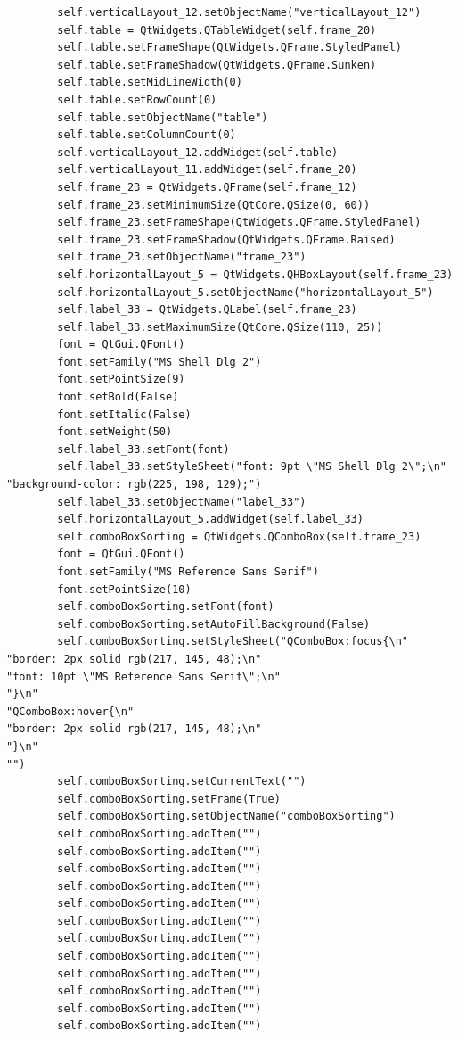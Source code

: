 \documentclass[12pt]{article}
\begin{document}
\begin{verbatim}
        self.verticalLayout_12.setObjectName("verticalLayout_12")
        self.table = QtWidgets.QTableWidget(self.frame_20)
        self.table.setFrameShape(QtWidgets.QFrame.StyledPanel)
        self.table.setFrameShadow(QtWidgets.QFrame.Sunken)
        self.table.setMidLineWidth(0)
        self.table.setRowCount(0)
        self.table.setObjectName("table")
        self.table.setColumnCount(0)
        self.verticalLayout_12.addWidget(self.table)
        self.verticalLayout_11.addWidget(self.frame_20)
        self.frame_23 = QtWidgets.QFrame(self.frame_12)
        self.frame_23.setMinimumSize(QtCore.QSize(0, 60))
        self.frame_23.setFrameShape(QtWidgets.QFrame.StyledPanel)
        self.frame_23.setFrameShadow(QtWidgets.QFrame.Raised)
        self.frame_23.setObjectName("frame_23")
        self.horizontalLayout_5 = QtWidgets.QHBoxLayout(self.frame_23)
        self.horizontalLayout_5.setObjectName("horizontalLayout_5")
        self.label_33 = QtWidgets.QLabel(self.frame_23)
        self.label_33.setMaximumSize(QtCore.QSize(110, 25))
        font = QtGui.QFont()
        font.setFamily("MS Shell Dlg 2")
        font.setPointSize(9)
        font.setBold(False)
        font.setItalic(False)
        font.setWeight(50)
        self.label_33.setFont(font)
        self.label_33.setStyleSheet("font: 9pt \"MS Shell Dlg 2\";\n"
"background-color: rgb(225, 198, 129);")
        self.label_33.setObjectName("label_33")
        self.horizontalLayout_5.addWidget(self.label_33)
        self.comboBoxSorting = QtWidgets.QComboBox(self.frame_23)
        font = QtGui.QFont()
        font.setFamily("MS Reference Sans Serif")
        font.setPointSize(10)
        self.comboBoxSorting.setFont(font)
        self.comboBoxSorting.setAutoFillBackground(False)
        self.comboBoxSorting.setStyleSheet("QComboBox:focus{\n"
"border: 2px solid rgb(217, 145, 48);\n"
"font: 10pt \"MS Reference Sans Serif\";\n"
"}\n"
"QComboBox:hover{\n"
"border: 2px solid rgb(217, 145, 48);\n"
"}\n"
"")
        self.comboBoxSorting.setCurrentText("")
        self.comboBoxSorting.setFrame(True)
        self.comboBoxSorting.setObjectName("comboBoxSorting")
        self.comboBoxSorting.addItem("")
        self.comboBoxSorting.addItem("")
        self.comboBoxSorting.addItem("")
        self.comboBoxSorting.addItem("")
        self.comboBoxSorting.addItem("")
        self.comboBoxSorting.addItem("")
        self.comboBoxSorting.addItem("")
        self.comboBoxSorting.addItem("")
        self.comboBoxSorting.addItem("")
        self.comboBoxSorting.addItem("")
        self.comboBoxSorting.addItem("")
        self.comboBoxSorting.addItem("")

\end{verbatim}
\end{document}
